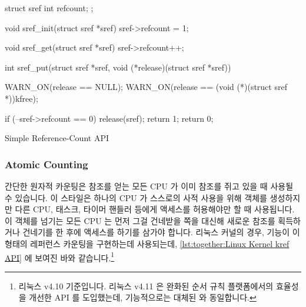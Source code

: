 \iffalse

Simple counting, with neither atomic operations nor memory barriers,
can be used when the reference-counter acquisition and release are
both protected by the same lock.
In this case, it should be clear that the reference count itself
may be manipulated non-atomically, because the lock provides any
necessary exclusion, memory barriers, atomic instructions, and disabling
of compiler optimizations.
This is the method of choice when the lock is required to protect
other operations in addition to the reference count, but where
a reference to the object must be held after the lock is released.
\Cref{lst:together:Simple Reference-Count API} shows a simple
API that might be used to implement simple non-atomic reference
counting---although simple reference counting is almost always
open-coded instead.

\fi

\begin{listing}[tbp]
\begin{fcvlabel}
\begin{VerbatimL}[commandchars=\\\[\]]
struct sref {
	int refcount;
};

void sref_init(struct sref *sref)
{
	sref->refcount = 1;
}

void sref_get(struct sref *sref)
{
	sref->refcount++;
}

int sref_put(struct sref *sref,
             void (*release)(struct sref *sref))
{
	WARN_ON(release == NULL);
	WARN_ON(release == (void (*)(struct sref *))kfree);

	if (--sref->refcount == 0) {
		release(sref);
		return 1;
	}
	return 0;
}
\end{VerbatimL}
\end{fcvlabel}
\caption{Simple Reference-Count API}
\label{lst:together:Simple Reference-Count API}
\end{listing}

\subsubsection{Atomic Counting}
\label{sec:together:Atomic Counting}

간단한 원자적 카운팅은 참조를 얻는 모든 CPU 가 이미 참조를 쥐고 있을 때 사용될
수 있습니다.
이 스타일은 하나의 CPU 가 스스로의 사적 사용을 위해 객체를 생성하지만 다른 CPU,
태스크, 타이머 핸들러 등에게 액세스를 허용해야만 할 때 사용됩니다.
이 객체를 넘기는 모든 CPU 는 먼저 그걸 건네받을 쪽을 대신해 새로운 참조를
획득하거나 건네기를 한 후에 액세스를 하기를 삼가야 합니다.
리눅스 커널의 경우,  기능이 이 형태의 레퍼런스 카운팅을 구현하는데
사용되는데,
\cref{lst:together:Linux Kernel kref API} 에 보여진 바와 같습니다.\footnote{
	리눅스 v4.10 기준입니다.
	리눅스 v4.11 은 완화된 순서 규칙 플랫폼에서의 효율성을 개선한
	 API 를 도입했는데, 기능적으로는 대체된  와
	동일합니다.}

